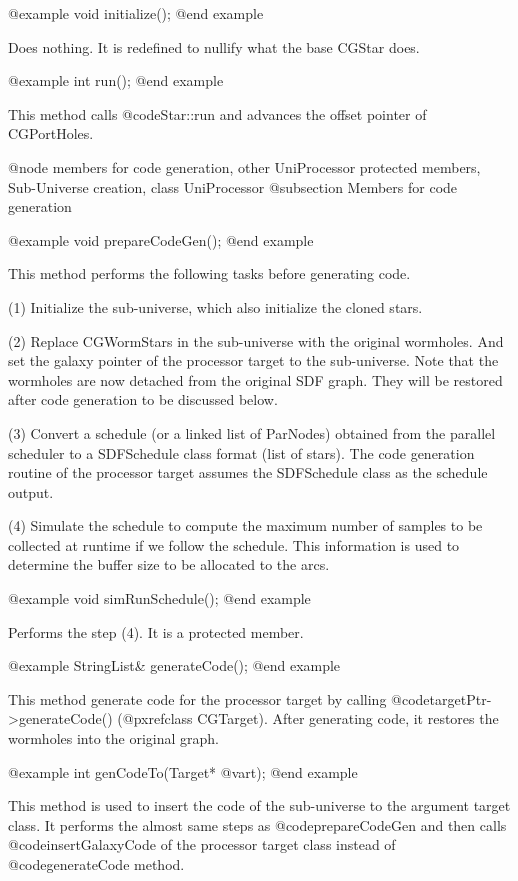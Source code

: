 @example
void initialize();
@end example

Does nothing. It is redefined to nullify what the base CGStar does.
 
@example
int run();
@end example

This method calls @code{Star::run} and advances the offset pointer of
CGPortHoles.

@node members for code generation, other UniProcessor protected members, Sub-Universe creation, class UniProcessor
@subsection Members for code generation

@example
void prepareCodeGen();
@end example

This method performs the following tasks before generating code.

(1) Initialize the sub-universe, which also initialize the cloned stars.

(2) Replace CGWormStars in the sub-universe with the original wormholes.
And set the galaxy pointer of the processor target to the sub-universe.
Note that the wormholes are now detached from the original SDF graph.
They will be restored after code generation to be discussed below.

(3) Convert a schedule (or a linked list of ParNodes) obtained from the
parallel scheduler to a SDFSchedule class format (list of stars). The
code generation routine of the processor target assumes the SDFSchedule
class as the schedule output.

(4) Simulate the schedule to compute the maximum number of samples
to be collected at runtime if we follow the schedule. This information
is used to determine the buffer size to be allocated to the arcs.

@example
void simRunSchedule();
@end example

Performs the step (4). It is a protected member.

@example
StringList& generateCode();
@end example

This method generate code for the processor target by calling
@code{targetPtr->generateCode()} (@pxref{class CGTarget}).
After generating code, it
restores the wormholes into the original graph.

@example
int genCodeTo(Target* @var{t});
@end example

This method is used to insert the code of the sub-universe to the
argument target class. It performs the almost same steps as
@code{prepareCodeGen} and then calls @code{insertGalaxyCode}
of the processor target class instead of @code{generateCode} method.

